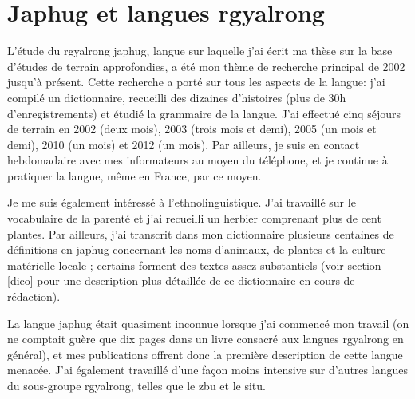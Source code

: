 \documentclass[oldfontcommands,oneside,a4paper,11pt]{memoir}
\begin{document}
\section{Japhug et langues rgyalrong}
	L’étude du rgyalrong japhug, langue sur laquelle j’ai écrit ma thèse sur la base d’études de terrain approfondies, a été mon thème de recherche principal de 2002 jusqu’à présent. Cette recherche a porté sur tous les aspects de la langue: j’ai compilé un dictionnaire, recueilli des dizaines d’histoires (plus de 30h d’enregistrements) et étudié la grammaire de la langue. J’ai effectué cinq séjours de terrain en 2002 (deux mois), 2003 (trois mois et demi), 2005 (un mois et demi), 2010 (un mois) et 2012 (un mois). Par ailleurs, je suis en contact hebdomadaire avec mes informateurs au moyen du téléphone, et je continue à pratiquer la langue, même en France, par ce moyen.
	
	
Je me suis également intéressé à l’ethnolinguistique. J’ai travaillé sur le vocabulaire de la parenté et j’ai recueilli un herbier comprenant plus de cent plantes. Par ailleurs, j’ai transcrit dans mon dictionnaire plusieurs centaines de définitions en japhug concernant les noms d’animaux, de plantes et la culture matérielle locale ; certains forment des textes assez substantiels   (voir section \ref{dico} pour une description plus détaillée de ce dictionnaire en cours de rédaction).

 La langue japhug était quasiment inconnue lorsque j’ai commencé mon travail (on ne comptait guère que dix pages dans un livre consacré aux langues rgyalrong en général), et mes publications offrent donc la première description de cette langue menacée. J’ai également travaillé d’une façon moins intensive sur d’autres langues du sous-groupe rgyalrong, telles que le zbu et le situ. 

\begin{newicktree}
  \small \label{fig:stammbaum}
  \setunitlength{15cm} \righttree \nobranchlengths \nodelabelformat{}
  \par %
\end{newicktree}
\end{document}
